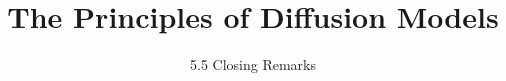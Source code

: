 
\title{The Principles of Diffusion Models}
\subtitle{5.5 Closing Remarks}


\begin{frame}
    \titlepage
\end{frame}


